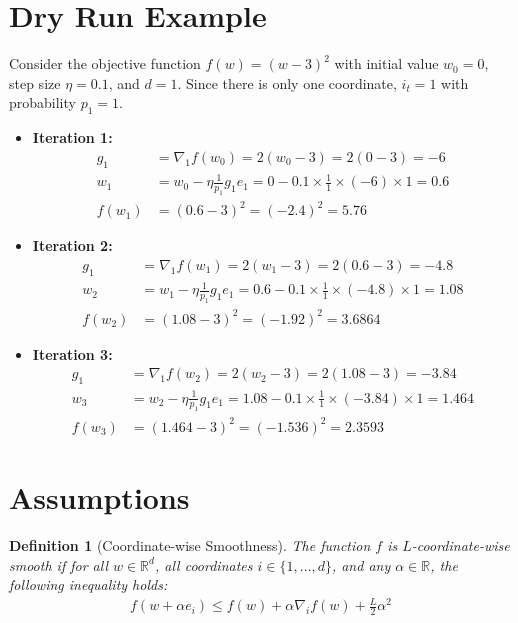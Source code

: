 \documentclass{article}
\newtheorem{definition}[theorem]{Definition}
\begin{document}
\section*{Dry Run Example}
Consider the objective function $f(w) = (w-3)^2$ with initial value $w_0 = 0$, step size $\eta = 0.1$, and $d=1$. Since there is only one coordinate, $i_t = 1$ with probability $p_1 = 1$.
\begin{itemize}
\item \textbf{Iteration 1:}
\begin{align*}
g_1 &= \nabla_1 f(w_0) = 2(w_0 - 3) = 2(0 - 3) = -6 \\
w_1 &= w_0 - \eta \frac{1}{p_1} g_1 e_1 = 0 - 0.1 \times \frac{1}{1} \times (-6) \times 1 = 0.6 \\
f(w_1) &= (0.6 - 3)^2 = (-2.4)^2 = 5.76
\end{align*}
\item \textbf{Iteration 2:}
\begin{align*}
g_1 &= \nabla_1 f(w_1) = 2(w_1 - 3) = 2(0.6 - 3) = -4.8 \\
w_2 &= w_1 - \eta \frac{1}{p_1} g_1 e_1 = 0.6 - 0.1 \times \frac{1}{1} \times (-4.8) \times 1 = 1.08 \\
f(w_2) &= (1.08 - 3)^2 = (-1.92)^2 = 3.6864
\end{align*}
\item \textbf{Iteration 3:}
\begin{align*}
g_1 &= \nabla_1 f(w_2) = 2(w_2 - 3) = 2(1.08 - 3) = -3.84 \\
w_3 &= w_2 - \eta \frac{1}{p_1} g_1 e_1 = 1.08 - 0.1 \times \frac{1}{1} \times (-3.84) \times 1 = 1.464 \\
f(w_3) &= (1.464 - 3)^2 = (-1.536)^2 = 2.3593
\end{align*}
\end{itemize}

\section*{Assumptions}
\begin{definition}[Coordinate-wise Smoothness]
The function $f$ is $L$-coordinate-wise smooth if for all $w \in \mathbb{R}^d$, all coordinates $i \in \{1, \dots, d\}$, and any $\alpha \in \mathbb{R}$, the following inequality holds:
\begin{align*}
f(w + \alpha e_i) \leq f(w) + \alpha \nabla_i f(w) + \frac{L}{2} \alpha^2
\end{align*}
\end{definition}
\end{document}
